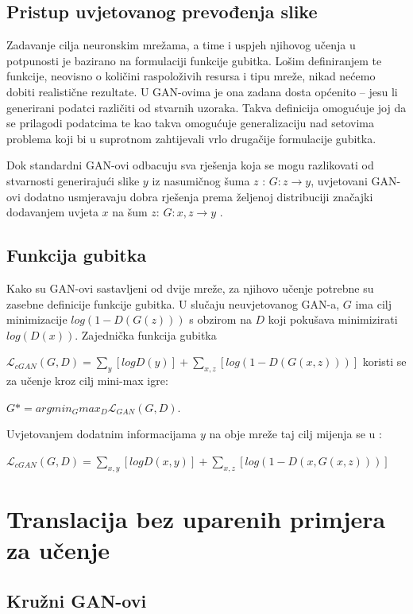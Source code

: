 \documentclass[lmodern, utf8, seminar]{fer}
\newcommand{\Lagr}{\mathcal{L}}
\begin{document}
\section{Pristup uvjetovanog prevođenja slike}
Zadavanje cilja neuronskim mrežama, a time i uspjeh njihovog učenja u potpunosti je bazirano na formulaciji funkcije gubitka. Lošim definiranjem te funkcije, neovisno o količini raspoloživih resursa i tipu mreže, nikad nećemo dobiti realistične rezultate. U GAN-ovima je ona zadana dosta općenito -- jesu li generirani podatci različiti od stvarnih uzoraka. Takva definicija omogućuje joj da se prilagodi podatcima te kao takva omogućuje generalizaciju nad setovima problema koji bi u suprotnom zahtijevali vrlo drugačije formulacije gubitka. 

Dok standardni GAN-ovi odbacuju sva rješenja koja se mogu razlikovati od stvarnosti generirajući slike $y$ iz nasumičnog šuma $z$ : $G: z \rightarrow y$, uvjetovani GAN-ovi dodatno usmjeravaju dobra rješenja prema željenoj distribuciji značajki dodavanjem uvjeta $x$ na šum $z$: $G: {x,z} \rightarrow y$ \cite{isola2017image}.

\section{Funkcija gubitka}
Kako su GAN-ovi sastavljeni od dvije mreže, za njihovo učenje potrebne su zasebne definicije funkcije gubitka. U slučaju neuvjetovanog GAN-a, $G$ ima cilj minimizacije $log(1 - D(G(z)))$ s obzirom na $D$ koji pokušava minimizirati $log(D(x))$.
Zajednička funkcija gubitka 

$ \Lagr_{cGAN}(G, D) = \sum_{y}[log D(y)] + \sum_{x,z}[log(1 - D(G(x,z)))]$
\newline
koristi se za učenje kroz cilj mini-max igre:

$ G* = arg min_G max_D \Lagr_{GAN}(G, D)$.
\newline

Uvjetovanjem dodatnim informacijama $y$ na obje mreže taj cilj mijenja se u : 

$ \Lagr_{cGAN}(G, D) = \sum_{x,y}[log D(x,y)] + \sum_{x,z}[log(1 - D(x, G(x,z)))]$




\chapter{Translacija bez uparenih primjera za učenje}
\section{Kružni GAN-ovi}
\end{document}
